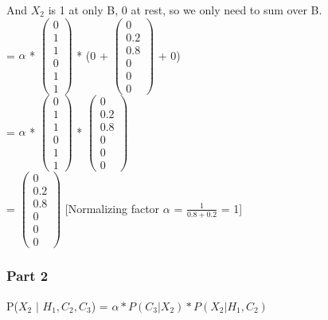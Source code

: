 \documentclass{article}
\begin{document}
And $X_2$ is 1 at only B, 0 at rest, so we only need to sum over B. \\ 
\indent 
= $\alpha$ * 
$\left(\begin{array}{c} 
        0  \\
        1 \\ 
        1 \\
        0 \\
        1 \\
        1
    \end{array}\right)$ * (0 + 
    $\left(\begin{array}{c} 
        0 \\
        0.2 \\ 
        0.8 \\
        0 \\
        0 \\
        0
    \end{array}\right)$ + 0) \\ 

\indent 
= $\alpha$ * 
$\left(\begin{array}{c} 
        0 \\
        1 \\ 
        1 \\
        0 \\
        1 \\
        1
    \end{array}\right)$ *
    $\left(\begin{array}{c} 
        0 \\
        0.2 \\ 
        0.8 \\
        0 \\
        0 \\
        0
    \end{array}\right)$ \\ 

\indent  
= $\left(\begin{array}{c} 
        0 \\
        0.2 \\ 
        0.8 \\
        0 \\
        0 \\
        0
    \end{array}\right)$ 
[Normalizing factor $\alpha$ = $\frac{1}{0.8+0.2}$ = 1]

\subsubsection*{Part 2}
P($X_2$ $\vert$ $H_1, C_2, C_3$) = $\alpha * P(C_3 \vert X_2) * P(X_2 \vert H_1, C_2)$ \\ 
\end{document}
